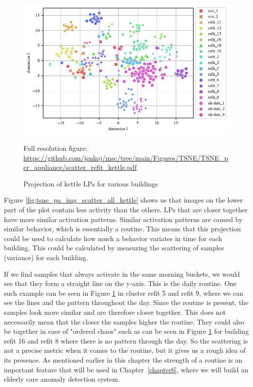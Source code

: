 \begin{figure}[H]
	\centering
	\caption{Projection of kettle LPs for various buildings}
	\includegraphics[]{Figures/TSNE/TSNE_per_appliance/scatter_refit_kettle.pdf}
	\label{fig:tsne_pa_scatter_all_kettle}
	\par
	\par\footnotesize{Full resolution figure: \url{https://github.com/jenkoj/msc/tree/main/Figures/TSNE/TSNE_per_appliance/scatter_refit_kettle.pdf}}
\end{figure}

Figure \ref{fig:tsne_pa_img_scatter_all_kettle} shows us that images on the lower part 
of the plot contain less activity than the others. 
LPs that are closer together have more similar activation patterns.
Similar activation patterns are caused by similar behavior, which is essentially a routine.
This means that this projection could be used to calculate how much a behavior variates in time for each building.
This could be calculated by measuring the scattering of samples (variance) for each building.

If we find samples that always activate in the same morning buckets, we would see that they form a straight line on the y-axis.
This is the daily routine. One such example can be seen in Figure \ref{fig:tsne_pa_scatter_all_kettle} in cluster refit 5 and refit 9, where we can see the lines and the pattern throughout the day. 
Since the routine is present, the samples look more similar and are therefore closer together. 
This does not necessarily mean that the closer the samples higher the routine.
They could also be together in case of "ordered chaos" such as can be seen in Figure \ref{fig:tsne_pa_scatter_all_kettle} for building refit 16 and refit 8 where there is no pattern through the day.
So the scattering is not a precise metric when it comes to the routine, but it gives us a rough idea of its presence.
As mentioned earlier in this chapter the strength of a routine is an important feature that will be used
in Chapter \ref{chapter6}, where we will build an elderly care anomaly detection system.

